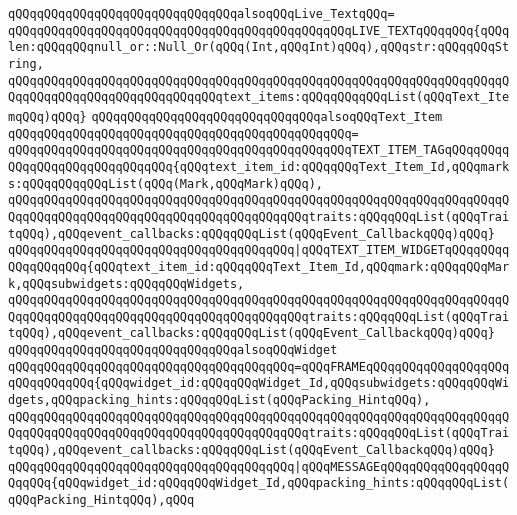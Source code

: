 \newline
\verb|qQQqqQQqqQQqqQQqqQQqqQQqqQQqqQQqalsoqQQqLive_TextqQQq=|\newline
\verb|qQQqqQQqqQQqqQQqqQQqqQQqqQQqqQQqqQQqqQQqqQQqqQQqLIVE_TEXTqQQqqQQq{qQQqlen:qQQqqQQqnull_or::Null_Or(qQQq(Int,qQQqInt)qQQq),qQQqstr:qQQqqQQqString,|\newline
\verb|qQQqqQQqqQQqqQQqqQQqqQQqqQQqqQQqqQQqqQQqqQQqqQQqqQQqqQQqqQQqqQQqqQQqqQQqqQQqqQQqqQQqqQQqqQQqqQQqqQQqtext_items:qQQqqQQqqQQqList(qQQqText_ItemqQQq)qQQq}|\newline
\newline
\verb|qQQqqQQqqQQqqQQqqQQqqQQqqQQqqQQqalsoqQQqText_Item|\newline
\verb|qQQqqQQqqQQqqQQqqQQqqQQqqQQqqQQqqQQqqQQqqQQqqQQq=|\newline
\verb|qQQqqQQqqQQqqQQqqQQqqQQqqQQqqQQqqQQqqQQqqQQqqQQqTEXT_ITEM_TAGqQQqqQQqqQQqqQQqqQQqqQQqqQQqqQQq{qQQqtext_item_id:qQQqqQQqText_Item_Id,qQQqmarks:qQQqqQQqqQQqList(qQQq(Mark,qQQqMark)qQQq),|\newline
\verb|qQQqqQQqqQQqqQQqqQQqqQQqqQQqqQQqqQQqqQQqqQQqqQQqqQQqqQQqqQQqqQQqqQQqqQQqqQQqqQQqqQQqqQQqqQQqqQQqqQQqqQQqqQQqqQQqtraits:qQQqqQQqList(qQQqTraitqQQq),qQQqevent_callbacks:qQQqqQQqList(qQQqEvent_CallbackqQQq)qQQq}|\newline
\verb|qQQqqQQqqQQqqQQqqQQqqQQqqQQqqQQqqQQqqQQq|\verb#|qQQqTEXT_ITEM_WIDGETqQQqqQQqqQQqqQQqqQQq{qQQqtext_item_id:qQQqqQQqText_Item_Id,qQQqmark:qQQqqQQqMark,qQQqsubwidgets:qQQqqQQqWidgets,#\newline
\verb|qQQqqQQqqQQqqQQqqQQqqQQqqQQqqQQqqQQqqQQqqQQqqQQqqQQqqQQqqQQqqQQqqQQqqQQqqQQqqQQqqQQqqQQqqQQqqQQqqQQqqQQqqQQqqQQqtraits:qQQqqQQqList(qQQqTraitqQQq),qQQqevent_callbacks:qQQqqQQqList(qQQqEvent_CallbackqQQq)qQQq}|\newline
\newline
\verb|qQQqqQQqqQQqqQQqqQQqqQQqqQQqqQQqalsoqQQqWidget|\newline
\verb|qQQqqQQqqQQqqQQqqQQqqQQqqQQqqQQqqQQqqQQq=qQQqFRAMEqQQqqQQqqQQqqQQqqQQqqQQqqQQqqQQq{qQQqwidget_id:qQQqqQQqWidget_Id,qQQqsubwidgets:qQQqqQQqWidgets,qQQqpacking_hints:qQQqqQQqList(qQQqPacking_HintqQQq),|\newline
\verb|qQQqqQQqqQQqqQQqqQQqqQQqqQQqqQQqqQQqqQQqqQQqqQQqqQQqqQQqqQQqqQQqqQQqqQQqqQQqqQQqqQQqqQQqqQQqqQQqqQQqqQQqqQQqqQQqtraits:qQQqqQQqList(qQQqTraitqQQq),qQQqevent_callbacks:qQQqqQQqList(qQQqEvent_CallbackqQQq)qQQq}|\newline
\verb|qQQqqQQqqQQqqQQqqQQqqQQqqQQqqQQqqQQqqQQq|\verb#|qQQqMESSAGEqQQqqQQqqQQqqQQqqQQqqQQq{qQQqwidget_id:qQQqqQQqWidget_Id,qQQqpacking_hints:qQQqqQQqList(qQQqPacking_HintqQQq),qQQq#\newline
